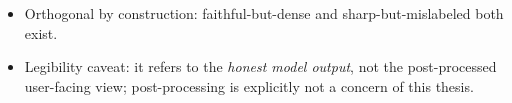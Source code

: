 \begin{itemize}
    \item Orthogonal by construction: faithful-but-dense and sharp-but-mislabeled both exist.
    \item Legibility caveat: it refers to the \emph{honest model output}, not the post-processed user-facing view; post-processing is explicitly not a concern of this thesis. 

\end{itemize}
